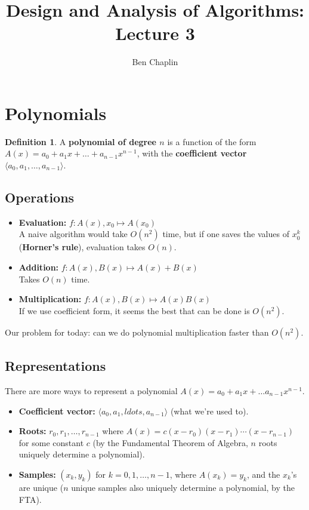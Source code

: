 \documentclass[11pt]{article}
\title{Design and Analysis of Algorithms: Lecture 3}
\author{Ben Chaplin}
\date{}
\theoremstyle{plain}
\theoremstyle{definition}
\newtheorem*{defn}{Definition}
\begin{document}
\maketitle
\tableofcontents

\section{Polynomials}

\begin{defn}
    A \textbf{polynomial of degree $n$} is a function of the form $A(x) = a_0 + a_1x + \ldots + 
    a_{n - 1}x^{n-1}$, with the \textbf{coefficient vector} $\langle a_0, a_1, \ldots, a_{n - 1}
    \rangle$.
\end{defn}

\subsection{Operations}

\begin{itemize}
    \item \textbf{Evaluation:} $f: A(x), x_0 \mapsto A(x_0)$\\
        A naive algorithm would take $O(n^2)$ time, but if one saves the values of $x_0^k$
        (\textbf{Horner's rule}), evaluation takes $O(n)$.

    \item \textbf{Addition:} $f: A(x), B(x) \mapsto A(x) + B(x)$\\
        Takes $O(n)$ time.

    \item \textbf{Multiplication:} $f: A(x), B(x) \mapsto A(x) B(x)$\\
        If we use coefficient form, it seems the best that can be done is $O(n^2)$.
\end{itemize}

Our problem for today: can we do polynomial multiplication faster than $O(n^2)$. 

\subsection{Representations}

There are more ways to represent a polynomial $A(x) = a_0 + a_1x + \ldots a_{n-1}x^{n-1}$.

\begin{itemize}
    \item \textbf{Coefficient vector:} $\langle a_0, a_1, ldots, a_{n-1} \rangle$ (what we're used to).
    \item \textbf{Roots:} $r_0, r_1, \ldots, r_{n - 1}$ where $A(x) = c(x - r_0)(x - r_1)\cdots
        (x - r_{n-1})$ for some constant $c$ (by the Fundamental Theorem of Algebra, $n$ roots 
        uniquely determine a polynomial).
    \item \textbf{Samples:} $(x_k, y_k)$ for $k = 0, 1, \ldots, n - 1$, where $A(x_k) = y_k$, and
        the $x_k$'s are unique ($n$ unique samples also uniquely determine a polynomial, by the FTA).
\end{itemize}
\end{document}
